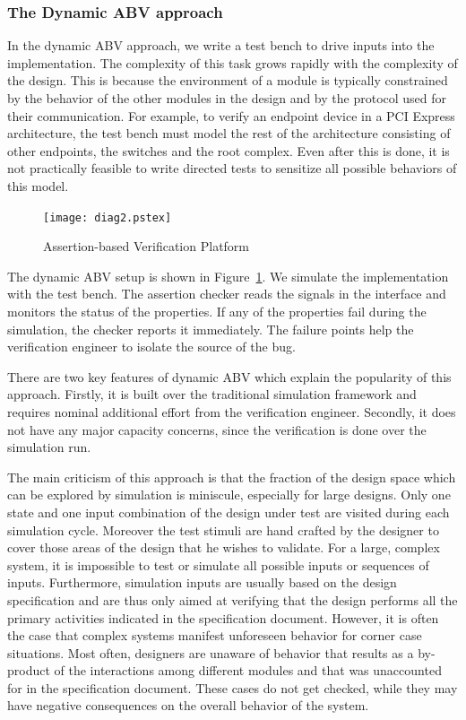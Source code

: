\documentclass[a4paper, 11pt]{article}
\begin{document}
\subsubsection{The Dynamic ABV approach} \label{sec2.2.2}
In the dynamic ABV approach, we write a test bench to drive inputs
into the implementation. The complexity of this task grows rapidly with the
complexity of the design. This is because the environment of a module is
typically constrained by the behavior of the other modules in the design
and by the protocol used for their communication. For example, to verify
an endpoint device in a PCI Express architecture, the test bench must model
the rest of the architecture consisting of other endpoints, the switches and
the root complex. Even after this is done, it is not practically feasible
to write directed tests to sensitize all possible behaviors of this model.

\begin{figure}[htb]
\centering
\texttt{[image: diag2.pstex]}
\center
\caption{Assertion-based Verification Platform} \label{fig1.2}
\end{figure}

The dynamic ABV setup is shown in Figure~\ref{fig1.2}. We simulate the
implementation with the test bench. The assertion checker reads the signals in
the interface and monitors the status of the properties. If any of the
properties fail during the simulation, the checker reports it immediately. The
failure points help the verification engineer to isolate the source of the bug.

There are two key features of dynamic ABV which explain the 
popularity of this approach. Firstly, it is built over the
traditional simulation framework and requires nominal additional effort
from the verification engineer. Secondly, it does not have any major capacity
concerns, since the verification is done over the simulation run.

The main criticism of this approach is that the fraction of the design 
space which can 
be explored by simulation is miniscule, especially for large designs. 
Only one state and one input combination of the design under test 
are visited during each simulation cycle. Moreover the test stimuli 
are hand crafted by the designer to cover those areas of the design 
that he wishes to validate. For a large, complex system, it is 
impossible to test or simulate all possible inputs or sequences 
of inputs. Furthermore, simulation inputs are usually based on the design 
specification and are thus only aimed at verifying that the design 
performs all the primary activities indicated in the specification 
document. However, it is often the case that complex systems manifest 
unforeseen behavior for corner case situations. Most often, designers 
are unaware of behavior that results as a by-product of the interactions 
among different modules and that was unaccounted for in the specification 
document. These cases do not get checked, while they may have 
negative consequences on the overall behavior of the system.
\end{document}
